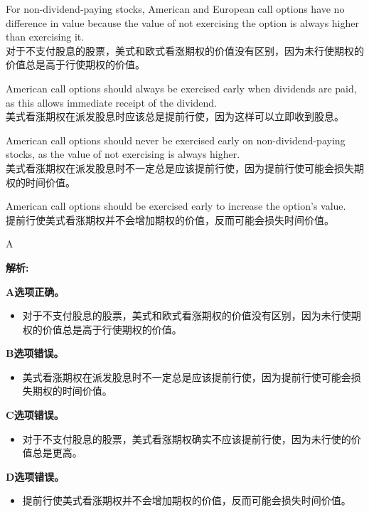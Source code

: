 \documentclass{article}
\newenvironment{explanation}
{\textbf{解析:}\par}
{\par}
\begin{document}
    \begin{choices}
    \item For non-dividend-paying stocks, American and European call options have no difference in value because the value of not exercising the option is always higher than exercising it.\\
    对于不支付股息的股票，美式和欧式看涨期权的价值没有区别，因为未行使期权的价值总是高于行使期权的价值。
    \item American call options should always be exercised early when dividends are paid, as this allows immediate receipt of the dividend.\\
    美式看涨期权在派发股息时应该总是提前行使，因为这样可以立即收到股息。
    \item American call options should never be exercised early on non-dividend-paying stocks, as the value of not exercising is always higher.\\
    美式看涨期权在派发股息时不一定总是应该提前行使，因为提前行使可能会损失期权的时间价值。
    \item American call options should be exercised early to increase the option's value.\\
    提前行使美式看涨期权并不会增加期权的价值，反而可能会损失时间价值。
    \end{choices}
    
    \begin{correctanswer}
    A
    \end{correctanswer}
    
    \begin{explanation}
    \textbf{A选项正确。}
    \begin{itemize}
    \item 对于不支付股息的股票，美式和欧式看涨期权的价值没有区别，因为未行使期权的价值总是高于行使期权的价值。
    \end{itemize}
    
    \textbf{B选项错误。}
    \begin{itemize}
    \item 美式看涨期权在派发股息时不一定总是应该提前行使，因为提前行使可能会损失期权的时间价值。
    \end{itemize}
    
    \textbf{C选项错误。}
    \begin{itemize}
    \item 对于不支付股息的股票，美式看涨期权确实不应该提前行使，因为未行使的价值总是更高。
    \end{itemize}
    
    \textbf{D选项错误。}
    \begin{itemize}
    \item 提前行使美式看涨期权并不会增加期权的价值，反而可能会损失时间价值。
    \end{itemize}
    \end{explanation}
\end{document}
